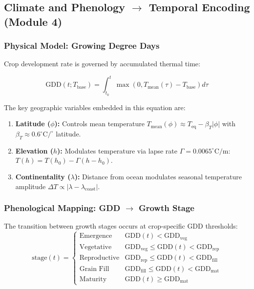 \subsection{Climate and Phenology $\to$ Temporal Encoding (Module 4)}

\subsubsection{Physical Model: Growing Degree Days}

Crop development rate is governed by accumulated thermal time:

\begin{equation}\label{eq:gdd-full}
    \text{GDD}(t; T_{\text{base}}) = \int_{t_0}^{t} \max\left(0,
    T_{\text{mean}}(\tau) - T_{\text{base}}\right) d\tau
\end{equation}

The key geographic variables embedded in this equation are:
\begin{enumerate}[nosep]
    \item \textbf{Latitude ($\phi$):} Controls mean temperature $T_{\text{mean}}(\phi) \approx
    T_{\text{eq}} - \beta_T |\phi|$ with $\beta_T \approx 0.6^\circ\text{C}/^\circ$
    latitude.
    \item \textbf{Elevation ($h$):} Modulates temperature via lapse rate
    $\Gamma = 0.0065^\circ\text{C/m}$: $T(h) = T(h_0) - \Gamma(h - h_0)$.
    \item \textbf{Continentality ($\lambda$):} Distance from ocean modulates
    seasonal temperature amplitude $\Delta T \propto |\lambda - \lambda_{\text{coast}}|$.
\end{enumerate}

\subsubsection{Phenological Mapping: GDD $\to$ Growth Stage}

The transition between growth stages occurs at crop-specific GDD thresholds:
\begin{equation}\label{eq:gdd-stages}
    \text{stage}(t) = \begin{cases}
        \text{Emergence} & \text{GDD}(t) < \text{GDD}_{\text{veg}} \\
        \text{Vegetative} & \text{GDD}_{\text{veg}} \leq \text{GDD}(t) < \text{GDD}_{\text{rep}} \\
        \text{Reproductive} & \text{GDD}_{\text{rep}} \leq \text{GDD}(t) < \text{GDD}_{\text{fill}} \\
        \text{Grain Fill} & \text{GDD}_{\text{fill}} \leq \text{GDD}(t) < \text{GDD}_{\text{mat}} \\
        \text{Maturity} & \text{GDD}(t) \geq \text{GDD}_{\text{mat}}
    \end{cases}
\end{equation}

